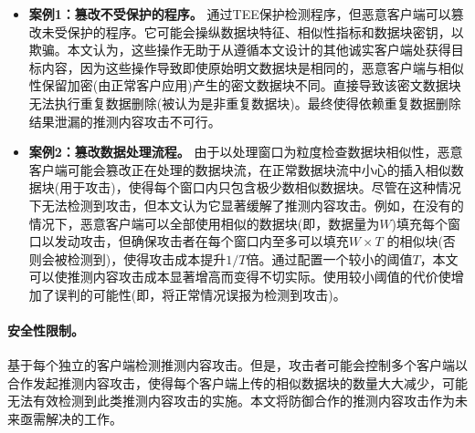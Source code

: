 \begin{itemize}[leftmargin=*]
    \item \textbf{案例1：篡改不受保护的程序。}
    \sysnameF 通过TEE保护检测程序，但恶意客户端可以篡改未受保护的程序。它可能会操纵数据块特征、相似性指标和数据块密钥，以欺骗\sysnameF。本文认为，这些操作无助于从遵循本文设计的其他诚实客户端处获得目标内容，因为这些操作导致即使原始明文数据块是相同的，恶意客户端与相似性保留加密(由正常客户应用)产生的密文数据块不同。直接导致该密文数据块无法执行重复数据删除(被认为是非重复数据块)。最终使得依赖重复数据删除结果泄漏的推测内容攻击不可行。
    \item \textbf{案例2：篡改数据处理流程。}
    由于\sysnameF 以处理窗口为粒度检查数据块相似性，恶意客户端可能会篡改正在处理的数据块流，在正常数据块流中小心的插入相似数据块(用于攻击)，使得每个窗口内只包含极少数相似数据块。尽管\sysnameF 在这种情况下无法检测到攻击，但本文认为它显著缓解了推测内容攻击。例如，在没有\sysnameF 的情况下，恶意客户端可以全部使用相似的数据块(即，数据量为$W$)填充每个窗口以发动攻击，但\sysnameF 确保攻击者在每个窗口内至多可以填充$W\times T$ 的相似块(否则会被检测到)，使得攻击成本提升$1/T$倍。通过配置一个较小的阈值$T$，本文可以使推测内容攻击成本显著增高而变得不切实际。使用较小阈值的代价使增加了误判的可能性(即，将正常情况误报为检测到攻击)。
\end{itemize}
  
\paragraph*{安全性限制。}\sysnameF 基于每个独立的客户端检测推测内容攻击。但是，攻击者可能会控制多个客户端以合作发起推测内容攻击，使得每个客户端上传的相似数据块的数量大大减少，\sysnameF 可能无法有效检测到此类推测内容攻击的实施。本文将防御合作的推测内容攻击作为未来亟需解决的工作。